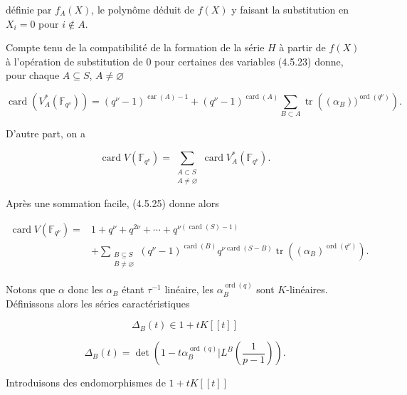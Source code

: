 définie par $f_A(X)$, le polynôme déduit de $f(X)$ y faisant la
substitution en $X_i=0$ pour $i\notin A$.


Compte tenu de la compatibilité de la formation de la série $H$ à partir de
$f(X)$ à l'opération de substitution de 0 pour certaines des variables
(4.5.23) donne, pour chaque $A\subseteq S$, $A\ne\varnothing$

\begin{equation}\tag{4.5.25}
\operatorname{card}(V_A^*(\mathbb F_{q^\nu}))
=(q^\nu-1)^{\operatorname{car}(A)-1}
+(q^\nu-1)^{\operatorname{card}(A)}
\sum_{B\subset A}
\operatorname{tr}\!\left((\alpha_B))^{\operatorname{ord}(q^\nu)}\right).
\end{equation}

D'autre part, on a

\begin{equation}\tag{4.5.26}
\operatorname{card}V(\mathbb F_{q^\nu})
=\sum_{\substack{A\subset S\\A\ne\varnothing}}
\operatorname{card}V_A^*(\mathbb F_{q^\nu}).
\end{equation}

Après une sommation facile, (4.5.25) donne alors

\begin{equation}\tag{4.5.27}
\begin{aligned}
\operatorname{card}V(\mathbb F_{q^\nu})
={}&1+q^\nu+q^{2\nu}+\cdots
+q^{\nu(\operatorname{card}(S)-1)}\\
&+\sum_{\substack{B\subseteq S\\B\ne\varnothing}}
(q^\nu-1)^{\operatorname{card}(B)}
q^{\nu\operatorname{card}(S-B)}
\operatorname{tr}\!\left((\alpha_B)^{\operatorname{ord}(q^\nu)}\right).
\end{aligned}
\end{equation}

Notons que $\alpha$ donc les $\alpha_B$ étant $\tau^{-1}$ linéaire, les
$\alpha_B^{\operatorname{ord}(q)}$ sont $K$-linéaires. Définissons alors les
séries caractéristiques

\[
\Delta_B(t)\in1+tK[[t]]
\]

\begin{equation}\tag{4.5.28}
\Delta_B(t)=\det\!\left(
1-t\alpha_B^{\operatorname{ord}(q)}
\mathrel{\Big|}L^B\!\left(\frac1{p-1}\right)\right).
\end{equation}

Introduisons des endomorphismes de $1+tK[[t]]$

